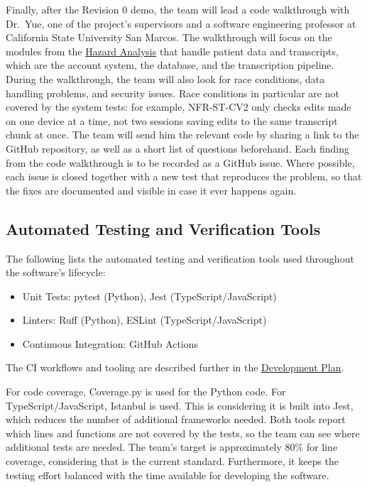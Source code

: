 \documentclass[12pt, titlepage]{article}
\newcommand{\HALink}{\href{https://github.com/Nour-Fawaz/MacaBoca/blob/main/pdfs/HazardAnalysis/HazardAnalysis.pdf}{Hazard Analysis}}
\newcommand{\DevPlanLink}{\href{https://github.com/Nour-Fawaz/MacaBoca/blob/main/pdfs/DevelopmentPlan/DevelopmentPlan.pdf}{Development Plan}}
\renewcommand{\_}{\oldunderscore\allowbreak}
\begin{document}
Finally, after the Revision 0 demo, the team will lead a code walkthrough with Dr.\ Yue, one of the project's supervisors and a software engineering professor at California State University San Marcos.
The walkthrough will focus on the modules from the \HALink{} that handle patient data and transcripts, which are the account system, the database, and the transcription pipeline. During the walkthrough, the team will also look for race conditions, data handling problems, and security issues. Race conditions in particular are not covered by the system tests: for example, NFR-ST-CV2 only checks edits made on one device at a time, not two sessions saving edits to the same transcript chunk at once. 
The team will send him the relevant code by sharing a link to the GitHub repository, as well as a short list of questions beforehand. Each finding from the code walkthrough is to be recorded as a GitHub issue. 
Where possible, each issue is closed together with a new test that reproduces the problem, so that the fixes are documented and visible in case it ever happens again.

\subsection{Automated Testing and Verification Tools} \label{sec:AutoTools}

The following lists the automated testing and verification tools used throughout the software's lifecycle:
\begin{itemize}
  \item Unit Tests: pytest (Python), Jest (TypeScript/JavaScript)
  \item Linters: Ruff (Python), ESLint (TypeScript/JavaScript)
  \item Continuous Integration: GitHub Actions
\end{itemize}

The CI workflows and tooling are described further in the \DevPlanLink.

For code coverage, Coverage.py is used for the Python code. For TypeScript/JavaScript, Istanbul is used. 
This is considering it is built into Jest, which reduces the number of additional frameworks needed. 
Both tools report which lines and functions are not covered by the tests, so the team can see where additional tests are needed. 
The team’s target is approximately 80\% for line coverage, considering that is the current standard. 
Furthermore, it keeps the testing effort balanced with the time available for developing the software.
\end{document}
